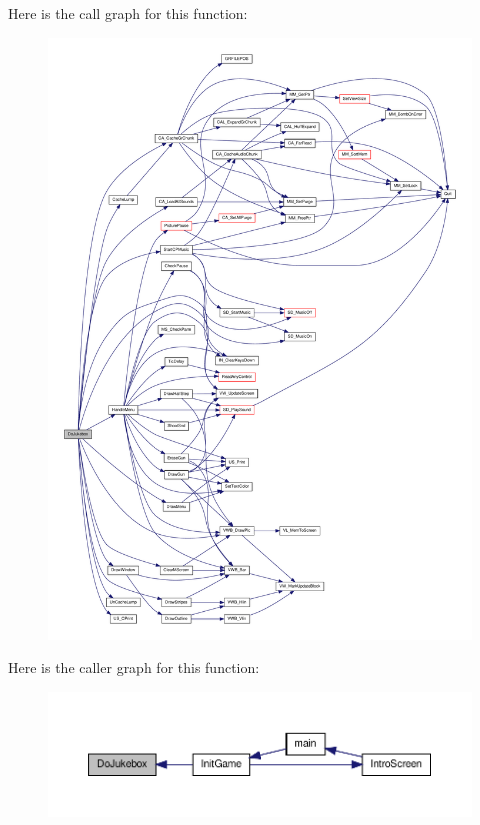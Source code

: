 Here is the call graph for this function:
\nopagebreak
\begin{figure}[H]
\begin{center}
\leavevmode
\includegraphics[width=400pt]{WL__MAIN_8C_aeff0948270bdff815c7b30e558e7129b_cgraph}
\end{center}
\end{figure}




Here is the caller graph for this function:
\nopagebreak
\begin{figure}[H]
\begin{center}
\leavevmode
\includegraphics[width=400pt]{WL__MAIN_8C_aeff0948270bdff815c7b30e558e7129b_icgraph}
\end{center}
\end{figure}



